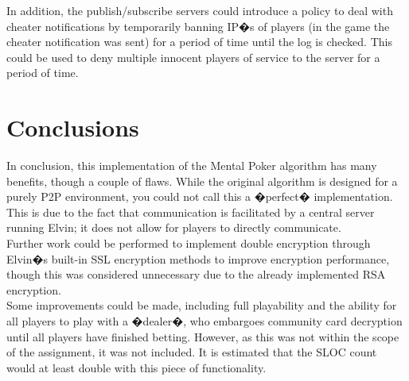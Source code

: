 \documentclass[11pt, oneside]{article}   	%
\begin{document}
In addition, the publish/subscribe servers could introduce a policy to deal with cheater notifications by temporarily banning IP�s of players (in the game the cheater notification was sent) for a period of time until the log is checked. This could be used to deny multiple innocent players of service to the server for a period of time.\\

\section{Conclusions}

In conclusion, this implementation of the Mental Poker algorithm has many benefits, though a couple of flaws. While the original algorithm is designed for a purely P2P environment, you could not call this a �perfect� implementation. This is due to the fact that communication is facilitated by a central server running Elvin; it does not allow for players to directly communicate.\\

Further work could be performed to implement double encryption through Elvin�s built-in SSL encryption methods to improve encryption performance, though this was considered unnecessary due to the already implemented RSA encryption.\\

Some improvements could be made, including full playability and the ability for all players to play with a �dealer�, who embargoes community card decryption until all players have finished betting. However, as this was not within the scope of the assignment, it was not included. It is estimated that the SLOC count would at least double with this piece of functionality.\\


\end{document}

